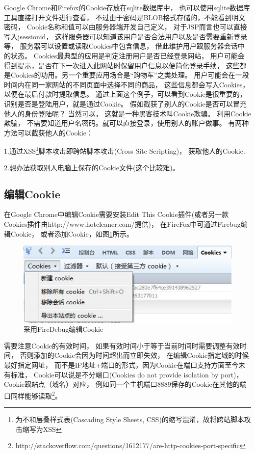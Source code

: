 \documentclass{book}
\begin{document}
Google Chrome和Firefox的Cookie存放在sqlite数据库中，
也可以使用sqlite数据库工具直接打开文件进行查看，
不过由于密码是BLOB格式存储的，不能看到明文密码，
Cookie名称和值可以由服务器端开发自己定义，
对于JSP而言也可以直接写入jsessionid，
这样服务器可以知道该用户是否合法用户以及是否需要重新登录等，
服务器可以设置或读取Cookies中包含信息，
借此维护用户跟服务器会话中的状态。
Cookies最典型的应用是判定注册用户是否已经登录网站，
用户可能会得到提示，是否在下一次进入此网站时保留用户信息以便简化登录手续，
这些都是Cookies的功用。另一个重要应用场合是“购物车”之类处理。
用户可能会在一段时间内在同一家网站的不同页面中选择不同的商品，
这些信息都会写入Cookies，以便在最后付款时提取信息。
通过上面这个例子，可以看到Cookie是很重要的，
识别是否是登陆用户，就是通过Cookie。  
假如截获了别人的Cookie是否可以冒充他人的身份登陆呢？  
当然可以， 这就是一种黑客技术叫Cookie欺骗。
利用Cookie欺骗， 不需要知道用户名密码。就可以直接登录，使用别人的账户做事。
有两种方法可以截获他人的Cookie：

1.通过XSS\footnote{为不和层叠样式表(Cascading Style Sheets,
CSS)的缩写混淆，故将跨站脚本攻击缩写为XSS}脚本攻击即跨站脚本攻击(Cross Site Scripting)，
获取他人的Cookie. 

2.想办法获取别人电脑上保存的Cookie文件(这个比较难)。

\subsection{编辑Cookie}

在Google Chrome中编辑Cookie需要安装Edit This Cookie插件(或者另一款Cookies插件由http://www.hotcleaner.com/提供)，
在FireFox中可通过Firebug编辑Cookie，
或者添加Cookie，如图\ref{fig:EditCookieUsingFireDebug}所示。

\begin{figure}[htbp]
	\centering
	\includegraphics[scale=0.8]{EditCookieUsingFireFox.jpg}
	\caption{采用FireDebug编辑Cookie}
	\label{fig:EditCookieUsingFireDebug}
\end{figure}

需要注意Cookie的有效时间，
如果有效时间小于等于当前时间时需要调整有效时间，
否则添加的Cookie会因为时间超出而立即失效，
在编辑Cookie指定域的时候最好指定网址，
而不是IP地址+端口的形式，因为Cookie在端口支持方面至今未有标准，
Cookie可以说是不分端口(Cookies do not provide isolation by port)，
Cookie跟站点（域名）对应，
例如同一个主机端口8889保存的Cookie在其他的端口同样能够读取\footnote{http://stackoverflow.com/questions/1612177/are-http-cookies-port-specific}。
\end{document}

